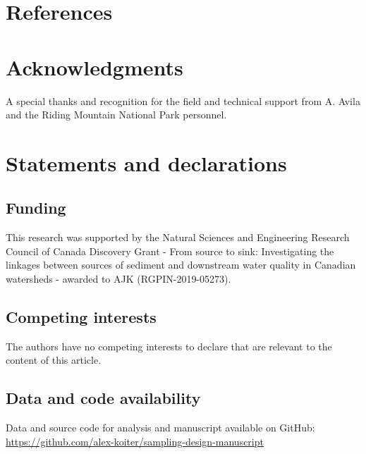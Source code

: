 \documentclass[
  number]{elsarticle}
\begin{document}
\section*{References}\label{references}

\section*{Acknowledgments}\label{acknowledgments}

A special thanks and recognition for the field and technical support
from A. Avila and the Riding Mountain National Park personnel.

\section*{Statements and
declarations}\label{statements-and-declarations}

\subsection*{Funding}\label{funding}

This research was supported by the Natural Sciences and Engineering
Research Council of Canada Discovery Grant - From source to sink:
Investigating the linkages between sources of sediment and downstream
water quality in Canadian watersheds - awarded to AJK
(RGPIN-2019-05273).

\subsection*{Competing interests}\label{competing-interests}

The authors have no competing interests to declare that are relevant to
the content of this article.

\subsection*{Data and code
availability}\label{data-and-code-availability}

Data and source code for analysis and manuscript available on GitHub:
\url{https://github.com/alex-koiter/sampling-design-manuscript}
\end{document}
